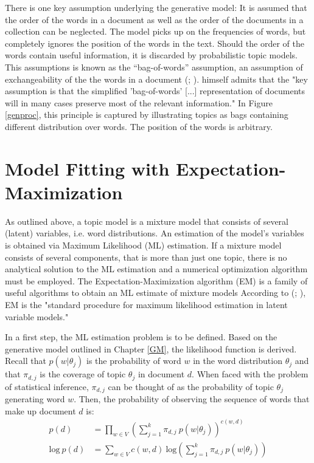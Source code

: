 \documentclass[11pt,a4paper,english,oneside]{book}
\numberwithin{equation}{chapter}
\begin{document}
There is one key assumption underlying the generative model: It is assumed that the order of the words in a document as well as the order of the documents in a collection can be neglected. The model picks up on the frequencies of words, but completely ignores the position of the words in the text. Should the order of the words contain useful information, it is discarded by probabilistic topic models. This assumptions is known as the “bag-of-words” assumption, an assumption of exchangeability of the the words in a document (\citealt[p.~994]{Blei.2003}; \citealt[~p. 3]{Steyvers(2007)}). \citet[~p. 290]{Hofmann.1999} himself admits that the "key assumption is that the simplified 'bag-of-words' [...] representation of documents will in many cases preserve most of the relevant information." In Figure \ref{genproc}, this principle is captured by illustrating topics as bags containing different distribution over words. The position of the words is arbitrary.
 
\section{Model Fitting with Expectation-Maximization}\label{Ch:model}

As outlined above, a topic model is a mixture model that consists of several (latent) variables, i.e. word distributions. An estimation of the model's variables is obtained via Maximum Likelihood (ML) estimation. If a mixture model consists of several components, that is more than just one topic, there is no analytical solution to the ML estimation and a numerical optimization algorithm must be employed. The Expectation-Maximization algorithm (EM) is a family of useful algorithms to obtain an ML estimate of mixture models \cite[~p. 359]{Zhai.2016} According to \citeauthor{Hofmann.1999} (\citeyear[p. 290]{Hofmann.1999}; \citeyear[p. 181]{Hofmann.2001}), EM is the "standard procedure for maximum likelihood estimation in latent variable models." 

In a first step, the ML estimation problem is to be defined. Based on the generative model outlined in Chapter \ref{GM}, the likelihood function is derived. Recall that $p(w | \theta_j)$ is the probability of word $w$ in the word distribution $\theta_j$ and that $\pi_{d,j}$ is the coverage of topic $\theta_j$ in document $d$. When faced with the problem of statistical inference, $\pi_{d,j}$ can be thought of as the probability of topic $\theta_j$ generating word $w$. Then, the probability of observing the sequence of words that make up document $d$ is:
\begin{align}
\label{prob} p(d) &= \underset{w \in V}\prod \left( \sum_{j=1}^{k}\pi_{d,j} \ p(w|\theta_j) \right)^{c(w,d)}\\
\label{log} \text{log} \ p(d) &= \underset{w \in V}\sum c(w,d) \ \text{log} \left( \sum_{j=1}^{k}\pi_{d,j} \ p(w|\theta_j) \right)
\end{align}
\end{document}
